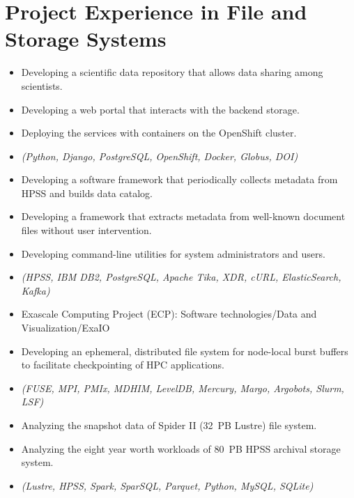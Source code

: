 \section{Project Experience in File and Storage Systems}

\begin{itemize}
 \item {Developing a scientific data repository that allows data sharing among scientists.}
 \item {Developing a web portal that interacts with the backend storage.}
 \item {Deploying the services with containers on the OpenShift cluster.}
 \item {\it\small(Python, Django, PostgreSQL, OpenShift, Docker, Globus, DOI) }
\end{itemize}

\begin{itemize}
 \item {Developing a software framework that periodically collects metadata from HPSS and builds data catalog.}
 \item {Developing a framework that extracts metadata from well-known document files without user intervention.}
 \item {Developing command-line utilities for system administrators and users.}
 \item {\it\small (HPSS, IBM DB2, PostgreSQL, Apache Tika, XDR, cURL, ElasticSearch, Kafka)}
\end{itemize}

\begin{itemize}
 \item {Exascale Computing Project (ECP): Software technologies/Data and Visualization/ExaIO}
 \item {Developing an ephemeral, distributed file system for node-local burst buffers to facilitate checkpointing of HPC applications.}
 \item {\it\small (FUSE, MPI, PMIx, MDHIM, LevelDB, Mercury, Margo, Argobots, Slurm, LSF)}
\end{itemize}

\begin{itemize}
 \item {Analyzing the snapshot data of Spider II (32~PB Lustre) file system.}
 \item {Analyzing the eight year worth workloads of 80~PB HPSS archival storage system.}
 \item {\it\small (Lustre, HPSS, Spark, SparSQL, Parquet, Python, MySQL, SQLite)}
\end{itemize}

